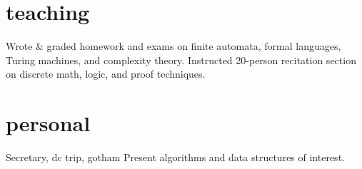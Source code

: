 \documentclass{cv}
\begin{document}
\section{teaching}

\begin{entrylist}
    {Wrote \& graded homework and exams on finite automata, formal languages, Turing machines, and complexity theory.}
    {Instructed 20-person recitation section on discrete math, logic, and proof techniques.}
\end{entrylist}

\section{personal}

\begin{entrylist}
  {Secretary, dc trip, gotham
  }
  {Present algorithms and data structures of interest.
  } 
\end{entrylist}
\end{document}
